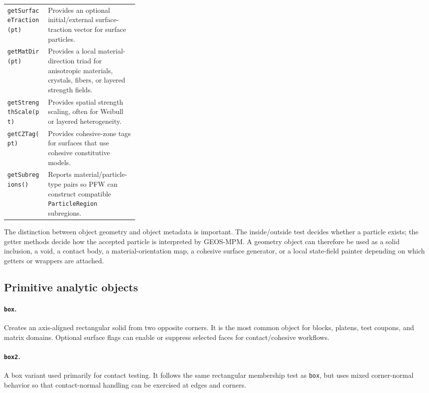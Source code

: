 \begin{table}[htbp]
\begin{tabularx}{\linewidth}{@{}p{0.31\linewidth}X@{}}
\texttt{getSurfaceTraction(pt)} & Provides an optional initial/external surface-traction vector for surface particles.\\
\texttt{getMatDir(pt)} & Provides a local material-direction triad for anisotropic materials, crystals, fibers, or layered strength fields.\\
\texttt{getStrengthScale(pt)} & Provides spatial strength scaling, often for Weibull or layered heterogeneity.\\
\texttt{getCZTag(pt)} & Provides cohesive-zone tags for surfaces that use cohesive constitutive models.\\
\texttt{getSubregions()} & Reports material/particle-type pairs so PFW can construct compatible \texttt{ParticleRegion} subregions.\\
\bottomrule
\end{tabularx}
\end{table}

The distinction between object geometry and object metadata is important.  The inside/outside test decides whether a particle exists; the getter methods decide how the accepted particle is interpreted by GEOS-MPM.  A geometry object can therefore be used as a solid inclusion, a void, a contact body, a material-orientation map, a cohesive surface generator, or a local state-field painter depending on which getters or wrappers are attached.

\subsection{Primitive analytic objects}

\paragraph{\texttt{box}.}Creates an axis-aligned rectangular solid from two opposite corners.  It is the most common object for blocks, platens, test coupons, and matrix domains.  Optional surface flags can enable or suppress selected faces for contact/cohesive workflows.

\paragraph{\texttt{box2}.}A box variant used primarily for contact testing.  It follows the same rectangular membership test as \texttt{box}, but uses mixed corner-normal behavior so that contact-normal handling can be exercised at edges and corners.

